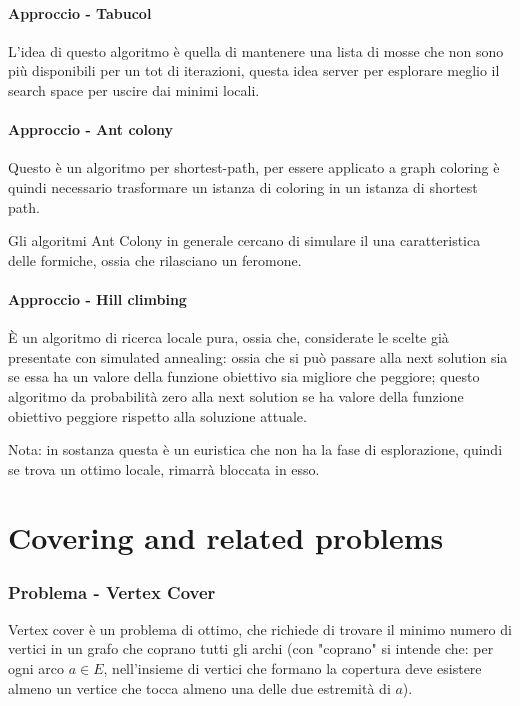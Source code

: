\documentclass[12pt,a4paper]{article}
\begin{document}
\subsection{Approccio - Tabucol}
L'idea di questo algoritmo è quella di mantenere una lista di mosse che non sono più disponibili per un tot di iterazioni, questa idea server per esplorare meglio il search space per uscire dai minimi locali.

\subsection{Approccio - Ant colony}
Questo è un algoritmo per shortest-path, per essere applicato a graph coloring è quindi necessario trasformare un istanza di coloring in un istanza di shortest path.

Gli algoritmi Ant Colony in generale cercano di simulare il una caratteristica delle formiche, ossia che rilasciano un feromone.

\subsection{Approccio - Hill climbing}
È un algoritmo di ricerca locale pura, ossia che, considerate le scelte già presentate con simulated annealing: ossia che si può passare alla next solution sia se essa ha un valore della funzione obiettivo sia migliore che peggiore; questo algoritmo da probabilità zero alla next solution se ha valore della funzione obiettivo peggiore rispetto alla soluzione attuale.

Nota: in sostanza questa è un euristica che non ha la fase di esplorazione, quindi se trova un ottimo locale, rimarrà bloccata in esso.

\pagebreak
\part{Covering and related problems}

\section{Problema - Vertex Cover}
Vertex cover è un problema di ottimo, che richiede di trovare il minimo numero di vertici in un grafo che coprano tutti gli archi (con "coprano" si intende che: per ogni arco $a \in E$, nell'insieme di vertici che formano la copertura deve esistere almeno un vertice che tocca almeno una delle due estremità di $a$).
\end{document}
